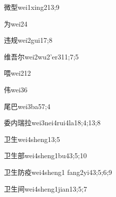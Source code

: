 \begin{verbete}{微型}{wei1xing2}{13;9}
\end{verbete}

\begin{verbete}{为}{wei2}{4}
\end{verbete}

\begin{verbete}{违规}{wei2gui1}{7;8}
\end{verbete}

\begin{verbete}{维吾尔}{wei2wu2'er3}{11;7;5}
\end{verbete}

\begin{verbete}{喂}{wei2}{12}
\end{verbete}

\begin{verbete}{伟}{wei3}{6}
\end{verbete}

\begin{verbete}{尾巴}{wei3ba5}{7;4}
\end{verbete}

\begin{verbete}{委内瑞拉}{wei3nei4rui4la1}{8;4;13;8}
\end{verbete}

\begin{verbete}{卫生}{wei4sheng1}{3;5}
\end{verbete}

\begin{verbete}{卫生部}{wei4sheng1bu4}{3;5;10}
\end{verbete}

\begin{verbete}{卫生防疫}{wei4sheng1 fang2yi4}{3;5;6;9}
\end{verbete}

\begin{verbete}{卫生间}{wei4sheng1jian1}{3;5;7}
\end{verbete}

